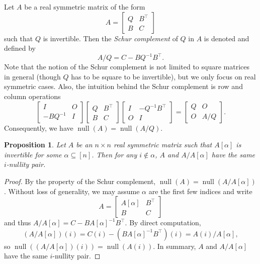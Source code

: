 \documentclass{article}
\newtheorem{proposition}[theorem]{Proposition}
\theoremstyle{definition}
\newcommand{\trans}{^\top}
\newcommand{\nul}{\operatorname{null}}
\begin{document}
Let $A$ be a real symmetric matrix of the form  
\[
    A = \begin{bmatrix}
        Q & B\trans \\
        B & C
    \end{bmatrix}
\]
such that $Q$ is invertible.  Then the \emph{Schur complement} of $Q$ in $A$ is denoted and defined by 
\[
    A/Q = C - BQ^{-1}B\trans.
\]
Note that the notion of the Schur complement is not limited to square matrices in general (though $Q$ has to be square to be invertible), but we only focus on real symmetric cases.  Also, the intuition behind the Schur complement is row and column operations
\[
    \begin{bmatrix}
        I & O \\
        -BQ^{-1} & I
    \end{bmatrix}
    \begin{bmatrix}
        Q & B\trans \\
        B & C
    \end{bmatrix}
    \begin{bmatrix}
        I & -Q^{-1}B\trans \\
        O & I
    \end{bmatrix} = 
    \begin{bmatrix}
    Q & O \\
    O & A / Q
    \end{bmatrix}.
\]
Consequently, we have $\nul(A) = \nul(A/Q)$.  

\begin{proposition}
\label{prop:schur}
Let $A$ be an $n\times n$ real symmetric matrix such that $A[\alpha]$ is invertible for some $\alpha\subseteq[n]$.  Then for any $i\notin\alpha$, $A$ and $A/A[\alpha]$ have the same $i$-nullity pair.
\end{proposition}
\begin{proof}
By the property of the Schur complement, $\nul(A) = \nul(A/A[\alpha])$.  Without loss of generality, we may assume $\alpha$ are the first few indices and write  
\[
    A = \begin{bmatrix}
        A[\alpha] & B\trans \\
        B & C
    \end{bmatrix}
\]
and thus $A/A[\alpha] = C - BA[\alpha]^{-1}B\trans$.  By direct computation, 
\[
    (A/A[\alpha])(i) = C(i) - (BA[\alpha]^{-1}B\trans)(i) = A(i)/A[\alpha],
\]
so $\nul((A/A[\alpha])(i)) = \nul(A(i))$.  In summary, $A$ and $A/A[\alpha]$ have the same $i$-nullity pair.
\end{proof}
\end{document}
